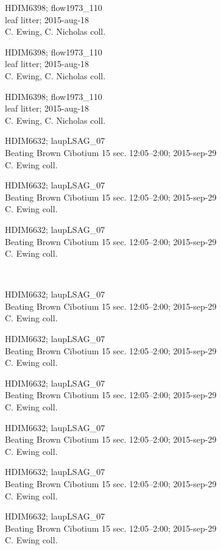 \documentclass[2pt]{extarticle}
\begin{document}
\noindent
\parbox{0.16\textwidth}{\tiny \raggedright \rule[-0.3\baselineskip]{0pt}{10pt}HDIM6398; flow1973\_110\\ leaf litter; 2015-aug-18\\ C. Ewing, C. Nicholas coll.}
\parbox{0.16\textwidth}{\tiny \raggedright \rule[-0.3\baselineskip]{0pt}{10pt}HDIM6398; flow1973\_110\\ leaf litter; 2015-aug-18\\ C. Ewing, C. Nicholas coll.}
\parbox{0.16\textwidth}{\tiny \raggedright \rule[-0.3\baselineskip]{0pt}{10pt}HDIM6398; flow1973\_110\\ leaf litter; 2015-aug-18\\ C. Ewing, C. Nicholas coll.}
\parbox{0.16\textwidth}{\tiny \raggedright \rule[-0.3\baselineskip]{0pt}{10pt}HDIM6632; laupLSAG\_07\\ Beating Brown Cibotium 15 sec. 12:05--2:00; 2015-sep-29\\ C. Ewing coll.}
\parbox{0.16\textwidth}{\tiny \raggedright \rule[-0.3\baselineskip]{0pt}{10pt}HDIM6632; laupLSAG\_07\\ Beating Brown Cibotium 15 sec. 12:05--2:00; 2015-sep-29\\ C. Ewing coll.}
\parbox{0.16\textwidth}{\tiny \raggedright \rule[-0.3\baselineskip]{0pt}{10pt}HDIM6632; laupLSAG\_07\\ Beating Brown Cibotium 15 sec. 12:05--2:00; 2015-sep-29\\ C. Ewing coll.} \\ 
\vspace{0.001in} 

\noindent
\parbox{0.16\textwidth}{\tiny \raggedright \rule[-0.3\baselineskip]{0pt}{10pt}HDIM6632; laupLSAG\_07\\ Beating Brown Cibotium 15 sec. 12:05--2:00; 2015-sep-29\\ C. Ewing coll.}
\parbox{0.16\textwidth}{\tiny \raggedright \rule[-0.3\baselineskip]{0pt}{10pt}HDIM6632; laupLSAG\_07\\ Beating Brown Cibotium 15 sec. 12:05--2:00; 2015-sep-29\\ C. Ewing coll.}
\parbox{0.16\textwidth}{\tiny \raggedright \rule[-0.3\baselineskip]{0pt}{10pt}HDIM6632; laupLSAG\_07\\ Beating Brown Cibotium 15 sec. 12:05--2:00; 2015-sep-29\\ C. Ewing coll.}
\parbox{0.16\textwidth}{\tiny \raggedright \rule[-0.3\baselineskip]{0pt}{10pt}HDIM6632; laupLSAG\_07\\ Beating Brown Cibotium 15 sec. 12:05--2:00; 2015-sep-29\\ C. Ewing coll.}
\parbox{0.16\textwidth}{\tiny \raggedright \rule[-0.3\baselineskip]{0pt}{10pt}HDIM6632; laupLSAG\_07\\ Beating Brown Cibotium 15 sec. 12:05--2:00; 2015-sep-29\\ C. Ewing coll.}
\parbox{0.16\textwidth}{\tiny \raggedright \rule[-0.3\baselineskip]{0pt}{10pt}HDIM6632; laupLSAG\_07\\ Beating Brown Cibotium 15 sec. 12:05--2:00; 2015-sep-29\\ C. Ewing coll.} \\ 
\vspace{0.001in} 
\end{document}
